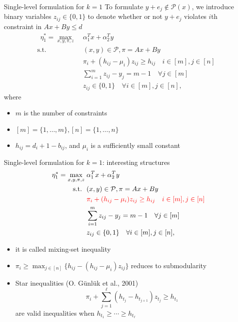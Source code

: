 \documentclass{beamer}
\begin{document}
\begin{frame}{Single-level formulation for $k=1$} \small
	To formulate $y+ e_j \notin \mathcal{P}(x)$, we introduce binary variables $z_{ij} \in \{0,1\}$ to denote whether or not $y+ e_j$ violates $i$th constraint in $Ax + By\leq d$
	\begin{align*}
	[\text{BP}_1]~~\eta_1^* = \max_{x, y, \pi, z}\; & \alpha_1^Tx + \alpha_2^Ty \nonumber \\
	\text{s.t.~~} &  (x, y)\in \mathcal{P}, \pi = Ax + By \\
	& \pi_i + (h_{ij} - \mu_i)z_{ij} \geq h_{ij} \quad i \in [m], j\in [n]  \\
	& \sum_{i=1}^m z_{ij} - y_j = m - 1  \quad \forall j\in [m]  \\
	& z_{ij} \in \{0,1\} \quad \forall i \in [m], j\in [n], 
	\end{align*}
	where 
	\begin{itemize}
		\item $m$ is the number of constraints
		\item $[m] = \{1, \ldots, m\}, [n] = \{1, \ldots, n\}$
		\item $h_{ij} = d_i + 1 - b_{ij}$, and $\mu_i$ is a sufficiently small constant
	\end{itemize}

\end{frame}

\begin{frame}{Single-level formulation for $k=1$: interesting structures} \small
\begin{align*}
[\text{BP}_1]~~\eta_1^* = \max_{x, y, \pi, z}\; & \alpha_1^Tx + \alpha_2^Ty \nonumber \\
\text{s.t.~~} &  (x, y)\in \mathcal{P}, \pi = Ax + By \\
& \color{red} \pi_i + (h_{ij} - \mu_i)z_{ij} \geq h_{ij} \quad i \in [m], j\in [n]  \\
& \sum_{i=1}^m z_{ij} - y_j = m - 1  \quad \forall j\in [m]  \\
& z_{ij} \in \{0,1\} \quad \forall i \in [m], j\in [n], 
\end{align*}
\begin{itemize}
	\item it is called mixing-set inequality
	\item $\pi_i \geq \max_{j \in [n]} \{h_{ij} - (h_{ij} - \mu_i)z_{ij}\}$ reduces to submodularity
	\item Star inequalities (O. G{\"u}nl{\"u}k et al., 2001)
	\[\pi_i + \sum_{j=1}^\ell (h_{t_j} - h_{t_{j+1}}) z_{t_j} \geq h_{t_1} \]
	are valid inequalities when $h_{t_1} \geq \cdots \geq h_{t_\ell}$
\end{itemize}


\end{frame}
\end{document}
